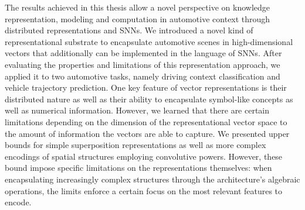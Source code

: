 The results achieved in this thesis allow a novel perspective on knowledge representation, modeling and computation in automotive context through distributed representations and \acp{SNN}.
We introduced a novel kind of representational substrate to encapsulate automotive scenes in high-dimensional vectors that additionally can be implemented in the language of \acp{SNN}.
After evaluating the properties and limitations of this representation approach, we applied it to two automotive tasks, namely driving context classification and vehicle trajectory prediction.
One key feature of vector representations is their distributed nature as well as their ability to encapsulate symbol-like concepts as well as numerical information.
However, we learned that there are certain limitations depending on the dimension of the representational vector space to the amount of information the vectors are able to capture.
We presented upper bounds for simple superposition representations as well as more complex encodings of spatial structures employing convolutive powers.
However, these bound impose specific limitations on the representations themselves: when encapsulating increasingly complex structures through the architecture's algebraic operations, the limits enforce a certain focus on the most relevant features to encode.

